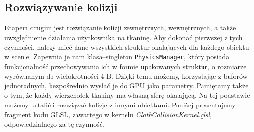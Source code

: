 		\subsection{Rozwiązywanie kolizji}
		\label{t:symulacja:dzialanie:kolizje}
			
		
		Etapem drugim jest rozwiązanie kolizji zewnętrznych, wewnętrznych, a także uwzględnienie działania użytkownika na tkaninę. Aby dokonać pierwszej z tych czynności, należy mieć dane wszystkich struktur okalających dla każdego obiektu w scenie. Zapewnia je nam klasa--singleton \texttt{PhysicsManager}, który posiada funkcjonalność przechowywania ich w formie upakowanych struktur, o rozmiarze wyrównanym do wielokrotności 4 B. Dzięki temu możemy, korzystając z buforów jednorodnych, bezpośrednio wysłać je do GPU jako parametry. Pamiętamy także o tym, że każdy wierzchołek tkaniny ma własną sferę okalającą. Na tej podstawie możemy ustalić i rozwiązać kolizje z innymi obiektami. Poniżej prezentujemy fragment kodu GLSL, zawartego w kernelu \emph{ClothCollisionKernel.glsl}, odpowiedzialnego za tę czynność.
		
